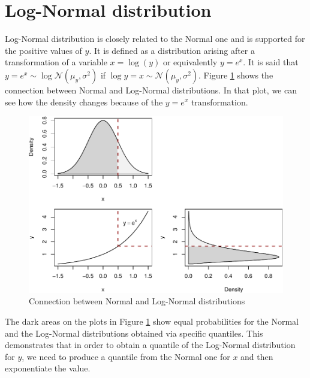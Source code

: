 \documentclass[
]{book}
\theoremstyle{definition}
\theoremstyle{definition}
\theoremstyle{definition}
\theoremstyle{definition}
\theoremstyle{remark}
\begin{document}
\hypertarget{distributionLogNormal}{%
\section{Log-Normal distribution}\label{distributionLogNormal}}

Log-Normal distribution is closely related to the Normal one and is supported for the positive values of \(y\). It is defined as a distribution arising after a transformation of a variable \(x=\log(y)\) or equivalently \(y=e^x\). It is said that \(y=e^x \sim \log\mathcal{N}(\mu_y, \sigma^2)\) if \(\log y = x \sim \mathcal{N}(\mu_y, \sigma^2)\). Figure \ref{fig:normalLogConnection} shows the connection between Normal and Log-Normal distributions. In that plot, we can see how the density changes because of the \(y=e^x\) transformation.

\begin{figure}
\centering
\includegraphics{Svetunkov---Statistics-for-Business-Analytics_files/figure-latex/normalLogConnection-1.pdf}
\caption{\label{fig:normalLogConnection}Connection between Normal and Log-Normal distributions}
\end{figure}

The dark areas on the plots in Figure \ref{fig:normalLogConnection} show equal probabilities for the Normal and the Log-Normal distributions obtained via specific quantiles. This demonstrates that in order to obtain a quantile of the Log-Normal distribution for \(y\), we need to produce a quantile from the Normal one for \(x\) and then exponentiate the value.
\end{document}
